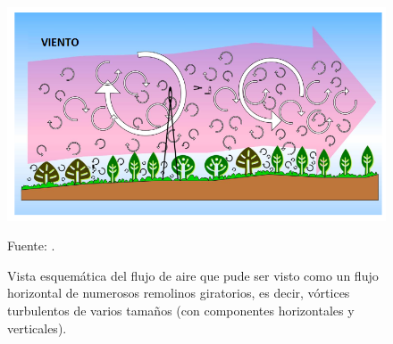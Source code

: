 \begin{figure}[ht!]
\centering
	\includegraphics[scale=0.77]{Images/wang01.png}
	\caption{Vista esquemática del flujo de aire que pude ser visto como un flujo horizontal de numerosos remolinos giratorios, es decir, vórtices turbulentos de varios tamaños (con componentes horizontales y verticales).}
	Fuente: \citet{wang2012review}.	
	\label{fig:wang01}
\end{figure}
